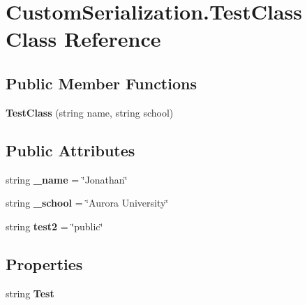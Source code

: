 \hypertarget{class_custom_serialization_1_1_test_class}{\section{Custom\-Serialization.\-Test\-Class Class Reference}
\label{class_custom_serialization_1_1_test_class}
}
\subsection*{Public Member Functions}
\begin{DoxyCompactItemize}
\item 
\hypertarget{class_custom_serialization_1_1_test_class_af5e849010093442821a37ef29444b761}{{\bfseries Test\-Class} (string name, string school)}\label{class_custom_serialization_1_1_test_class_af5e849010093442821a37ef29444b761}

\end{DoxyCompactItemize}
\subsection*{Public Attributes}
\begin{DoxyCompactItemize}
\item 
\hypertarget{class_custom_serialization_1_1_test_class_a620913fa34517288187a3f993a7f4002}{string {\bfseries \-\_\-name} = \char`\"{}Jonathan\char`\"{}}\label{class_custom_serialization_1_1_test_class_a620913fa34517288187a3f993a7f4002}

\item 
\hypertarget{class_custom_serialization_1_1_test_class_aa2d507572857d89852dded978e608cbd}{string {\bfseries \-\_\-school} = \char`\"{}Aurora University\char`\"{}}\label{class_custom_serialization_1_1_test_class_aa2d507572857d89852dded978e608cbd}

\item 
\hypertarget{class_custom_serialization_1_1_test_class_a9df1a172a41ddf741020e071dd02bc09}{string {\bfseries test2} = \char`\"{}public\char`\"{}}\label{class_custom_serialization_1_1_test_class_a9df1a172a41ddf741020e071dd02bc09}

\end{DoxyCompactItemize}
\subsection*{Properties}
\begin{DoxyCompactItemize}
\item 
\hypertarget{class_custom_serialization_1_1_test_class_a11515048e0b781252bd051abd88d501f}{string {\bfseries Test}}\label{class_custom_serialization_1_1_test_class_a11515048e0b781252bd051abd88d501f}

\end{DoxyCompactItemize}


